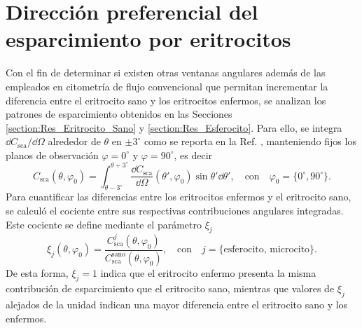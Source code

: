 
\section{Dirección preferencial del esparcimiento por eritrocitos}
\label{section:angle_interval}
\vspace{-0.2cm}

Con el fin de determinar si existen otras ventanas angulares además de las empleados en citometría de flujo convencional que permitan incrementar la diferencia entre el eritrocito sano y los eritrocitos enfermos, se analizan los patrones de esparcimiento obtenidos en las Secciones \ref{section:Res_Eritrocito_Sano} y \ref{section:Res_Esferocito}. Para ello, se integra $\dd{C_{\text{sca}}}/\dd{\Omega}$  alrededor de $\theta$ en $\pm 3^{\circ}$ como se reporta en la Ref. \cite{giengerAssessmentDeformationHuman2019}, manteniendo fijos los planos de observación $\varphi=0^\circ$ y $\varphi=90^\circ$, es decir
%
\begin{equation}
	C_{\text{sca}}(\theta,\varphi_0)=\int_{\theta-3^{\circ}}^{\theta+3^{\circ}}\dfrac{\dd{C_{\text{sca}}}}{\dd{\Omega}}(\theta',\varphi_0)\sin\theta'\dd{\theta'},\quad \text{con}\quad \varphi_0=\{0^{\circ},90^{\circ}\}.
\end{equation}
%
Para cuantificar las diferencias entre los eritrocitos enfermos y el eritrocito sano, se calculó el cociente entre sus respectivas contribuciones angulares integradas. Este cociente se define mediante el parámetro $\xi_j$
%
\begin{equation}
	\xi_j(\theta,\varphi_0)=\dfrac{C_{\text{sca}}^j(\theta,\varphi_0)}{	C_{\text{sca}}^{\text{sano}}(\theta,\varphi_0)},\quad \text{con}\quad j=\{\text{esferocito, microcito}\}.
	\label{eq:parametro_xi}
\end{equation}
De esta forma, $\xi_j=1$ indica que el eritrocito enfermo presenta la misma contribución de esparcimiento que el eritrocito sano, mientras que valores de $\xi_j$ alejados de la unidad indican una mayor diferencia entre el eritrocito sano y los enfermos. 

